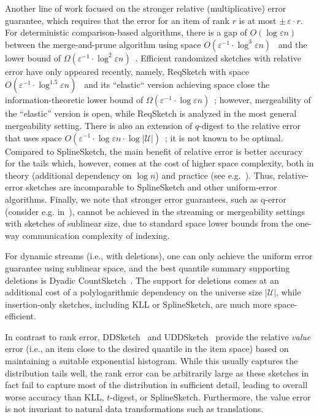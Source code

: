 \documentclass[acmsmall]{acmart}
\newcommand{\eps}{\varepsilon}
\theoremstyle{remark}
\begin{document}
Another line of work focused on the stronger relative (multiplicative) error guarantee, which 
requires that the error for an item of rank $r$ is at most $\pm\, \eps\cdot r$.
For deterministic comparison-based algorithms,
there is a gap of $O(\log \eps n)$ between the merge-and-prune algorithm using space $O(\eps^{-1}\cdot \log^3 \eps n)$~\cite{zhangwang}
and the lower bound of $\Omega(\eps^{-1}\cdot \log^2 \eps n)$~\cite{CormodeV20}.
Efficient randomized sketches with relative error have only appeared
recently, namely, ReqSketch with space $O(\eps^{-1}\cdot \log^{1.5} \eps n)$~\cite{CormodeKLTV23} %
and its ``elastic`` version achieving space close the information-theoretic lower bound of
$\Omega(\eps^{-1}\cdot \log \eps n)$~\cite{GribelyukSWY25elasticCompactors}; however, mergeability of the ``elastic'' version is open,
while ReqSketch is analyzed in the most general mergeability setting.
There is also an extension of $q$-digest to the relative error
that uses space $O(\eps^{-1}\cdot \log \eps n\cdot \log |\mathcal{U}|)$~\cite{cormode2006space};
it is not known to be optimal.
Compared to SplineSketch, the main benefit of relative error is better accuracy for the tails which, however, comes at the cost
of higher space complexity, both in theory (additional dependency on $\log n$) and practice (see e.g.~\cite{CormodeMRV21}).
Thus, relative-error sketches are incomparable to SplineSketch and other uniform-error algorithms.
Finally, we note that stronger error guarantees, such as q-error (consider e.g. in~\cite{moerkotte2014exploiting}),
cannot be achieved in the streaming or mergeability settings with sketches of sublinear size, due to standard space lower bounds from the one-way communication complexity of indexing.

For dynamic streams (i.e., with deletions), one can only achieve the uniform error guarantee using sublinear space,
and the best quantile summary supporting deletions is Dyadic CountSketch~\cite{luo16_quantiles_experimental}.
The support for deletions comes at an additional cost of a polylogarithmic dependency on the universe size $|\mathcal{U}|$,
while insertion-only sketches, including KLL or SplineSketch, are much more space-efficient.

In contrast to rank error, DDSketch~\cite{MassonRL19} and UDDSketch~\cite{EpicocoMCPM20}
provide the relative \emph{value} error (i.e., an item close to the desired quantile in the item space)
based on maintaining a suitable exponential histogram.
While this usually captures the distribution tails well, the rank error can be arbitrarily large as these sketches in fact fail to capture most of the distribution in sufficient detail, leading to overall worse accuracy than KLL, $t$-digest, or SplineSketch.
	Furthermore, the value error is not invariant to natural data transformations such as translations.
\end{document}
